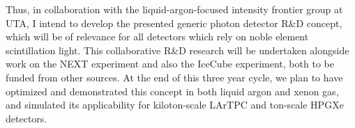 Thus, in collaboration with the liquid-argon-focused intensity frontier group at UTA, I intend to develop the presented generic photon detector R\&D concept, which will be of relevance for all detectors which rely on noble element scintillation light.  This collaborative R\&D research will be undertaken alongside work on the NEXT experiment and also the IceCube experiment, both to be funded from other sources.  At the end of this three year cycle, we plan to have optimized and demonstrated this concept in both liquid argon and xenon gas, and simulated its applicability for kiloton-scale LArTPC and ton-scale HPGXe detectors.
